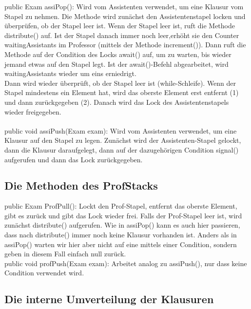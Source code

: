 \documentclass[12pt,a4paper]{article}
\begin{document}
public Exam assiPop(): Wird vom Assistenten verwendet, um eine Klausur vom Stapel zu nehmen. Die Methode wird zunächst den Assistentenstapel locken und überprüfen, ob der Stapel leer ist. Wenn der Stapel leer ist, ruft die Methode distribute() auf. Ist der Stapel danach immer noch leer,erhöht sie den Counter waitingAssistants im Professor (mittels der Methode increment()). Dann ruft die Methode auf der Condition des Locks await() auf, um zu warten, bis wieder jemand etwas auf den Stapel legt. Ist der await()-Befehl abgearbeitet, wird waitingAssistants wieder um eins erniedrigt.\\ Dann wird wieder überprüft, ob der Stapel leer ist (while-Schleife). Wenn der Stapel mindestens ein Element hat, wird das oberste Element erst entfernt (1) und dann zurückgegeben (2). Danach wird das Lock des Assistentenstapels wieder freigegeben.\\
\\

public void assiPush(Exam exam): Wird vom Assistenten verwendet, um eine Klausur auf den Stapel zu legen. Zunächst wird der Assistenten-Stapel gelockt, dann die Klausur daraufgelegt, dann auf der dazugehörigen Condition signal() aufgerufen und dann das Lock zurückgegeben.

\subsection{Die Methoden des ProfStacks}

public Exam ProfPull(): Lockt den Prof-Stapel, entfernt das oberste Element, gibt es zurück und gibt das Lock wieder frei. Falls der Prof-Stapel leer ist, wird zunächst distribute() aufgerufen. Wie in assiPop() kann es auch hier passieren, dass nach distribute() immer noch keine Klausur vorhanden ist. Anders als in assiPop() warten wir hier aber nicht auf eine mittels einer Condition, sondern geben in diesem Fall einfach null zurück.
\\
public void profPush(Exam exam): Arbeitet analog zu assiPush(), nur dass keine Condition verwendet wird.

\subsection{Die interne Umverteilung der Klausuren}
\end{document}
